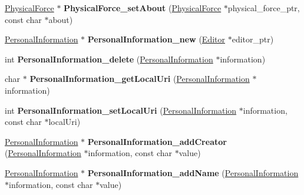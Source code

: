 \begin{DoxyCompactItemize}
\hyperlink{classomexmeta_1_1PhysicalForce}{Physical\+Force} $\ast$ {\bfseries Physical\+Force\+\_\+set\+About} (\hyperlink{classomexmeta_1_1PhysicalForce}{Physical\+Force} $\ast$physical\+\_\+force\+\_\+ptr, const char $\ast$about)
\item 
\mbox{\label{namespaceomexmeta_a119fbc0317a5af631e7f68caece8c70b}} 
\hyperlink{classomexmeta_1_1PersonalInformation}{Personal\+Information} $\ast$ {\bfseries Personal\+Information\+\_\+new} (\hyperlink{classomexmeta_1_1Editor}{Editor} $\ast$editor\+\_\+ptr)
\item 
\mbox{\label{namespaceomexmeta_a5dcd490456bde3f95069f91e65c2b042}} 
int {\bfseries Personal\+Information\+\_\+delete} (\hyperlink{classomexmeta_1_1PersonalInformation}{Personal\+Information} $\ast$information)
\item 
\mbox{\label{namespaceomexmeta_a9db9c9c591926b3e9061b2ca7cb4541f}} 
char $\ast$ {\bfseries Personal\+Information\+\_\+get\+Local\+Uri} (\hyperlink{classomexmeta_1_1PersonalInformation}{Personal\+Information} $\ast$information)
\item 
\mbox{\label{namespaceomexmeta_af1ed67bfbe5c55b04c5164030f9f5fef}} 
int {\bfseries Personal\+Information\+\_\+set\+Local\+Uri} (\hyperlink{classomexmeta_1_1PersonalInformation}{Personal\+Information} $\ast$information, const char $\ast$local\+Uri)
\item 
\mbox{\label{namespaceomexmeta_a46f59a8d3104d824826d5dd104d55393}} 
\hyperlink{classomexmeta_1_1PersonalInformation}{Personal\+Information} $\ast$ {\bfseries Personal\+Information\+\_\+add\+Creator} (\hyperlink{classomexmeta_1_1PersonalInformation}{Personal\+Information} $\ast$information, const char $\ast$value)
\item 
\mbox{\label{namespaceomexmeta_af1ab848f3e3f81ab4dbc822c84aab92e}} 
\hyperlink{classomexmeta_1_1PersonalInformation}{Personal\+Information} $\ast$ {\bfseries Personal\+Information\+\_\+add\+Name} (\hyperlink{classomexmeta_1_1PersonalInformation}{Personal\+Information} $\ast$information, const char $\ast$value)
\item 
\mbox{\label{namespaceomexmeta_a30bf0fbfd78a23a0e2d87e1cb981cc8a}} 

\end{DoxyCompactItemize}
